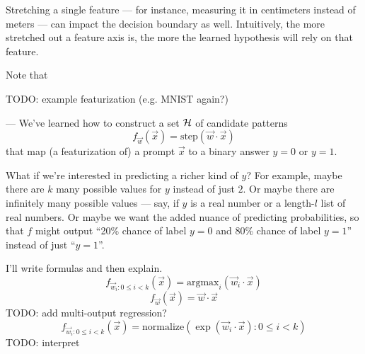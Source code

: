 \documentclass[11pt, justified]{tufte-book}
\newcommand{\attnsam}[1]{{\red \textsf{#1}}}
\newcommand{\sampassage}[1]{
   \vspace{0.1cm}
   \par\noindent{\hspace{-2cm}\normalsize \sc \gre #1} ---
}
\newcommand{\sfx}{\mathsf{x}}\newcommand{\frx}{\mathcal{x}}
\newcommand{\sfy}{\mathsf{y}}\newcommand{\fry}{\mathcal{y}}
\theoremstyle{definition}
\begin{document}
        Stretching a single feature --- for instance, measuring it in
        centimeters instead of meters --- can impact the decision boundary
        as well.  Intuitively, the more stretched out a feature axis is, 
        the more the learned hypothesis will rely on that feature.

        Note that


        \attnsam{TODO: example featurization (e.g. MNIST again?)}


      \sampassage{richer outputs}%
        We've learned how to construct a set $\mathcal{H}$ of candidate patterns 
        $$
          f_{\vec w}(\vec x) = \text{step}(\vec w\cdot \vec x) 
        $$
        that map (a featurization of) a prompt $\vec x$ to a binary answer $y=0$ or $y=1$.

        What if we're interested in predicting a richer kind of $y$?  For
        example, maybe there are $k$ many possible values for $y$ instead of
        just $2$.  Or maybe there are infinitely many possible values --- say,
        if $y$ is a real number or a length-$l$ list of real numbers.  Or maybe we want the added nuance of
        predicting probabilities, so that $f$ might output ``20\% chance of
        label $y=0$ and 80\% chance of label $y=1$'' instead of just ``$y=1$''.

        I'll write formulas and then explain.
        $$
          f_{\vec w_i : 0\leq i < k}(\vec x) = \text{argmax}_i(\vec w_i\cdot \vec x) 
        $$
        $$
          f_{\vec w}(\vec x) = \vec w \cdot \vec x
        $$
        \attnsam{TODO: add multi-output regression?}
        $$
          f_{\vec w_i  : 0\leq i < k}(\vec x) = \text{normalize}(\exp(\vec w_i \cdot \vec x) : 0\leq i < k)
        $$
        \attnsam{TODO: interpret}
\end{document}
